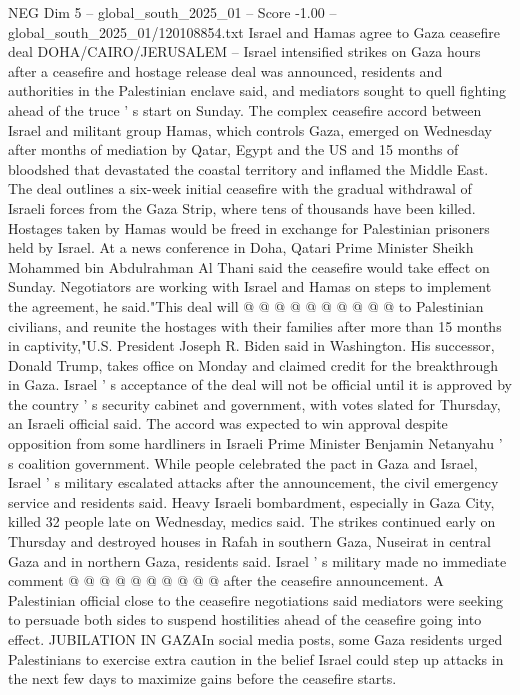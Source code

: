 \begin{textsample}{NEG Dim 5 – global\_south\_2025\_01 – Score -1.00 – global\_south\_2025\_01/120108854.txt}  \label{ex:f5_neg_107}
Israel and Hamas agree to Gaza ceasefire deal DOHA/CAIRO/JERUSALEM -- Israel intensified strikes on Gaza hours after a ceasefire and hostage release deal was announced, residents and authorities in the Palestinian enclave said, and mediators sought to quell fighting ahead of the truce ' s start on Sunday.
The complex ceasefire accord between Israel and militant group Hamas, which controls Gaza, emerged on Wednesday after months of mediation by Qatar, Egypt and the US and 15 months of bloodshed that devastated the coastal territory and inflamed the Middle East.
The deal outlines a six-week initial ceasefire with the gradual withdrawal of Israeli forces from the Gaza Strip, where tens of thousands have been killed.
Hostages taken by Hamas would be freed in exchange for Palestinian prisoners held by Israel.
At a news conference in Doha, Qatari Prime Minister Sheikh Mohammed bin Abdulrahman Al Thani said the ceasefire would take effect on Sunday.
Negotiators are working with Israel and Hamas on steps to implement the agreement, he said."This deal will @ @ @ @ @ @ @ @ @ @ to Palestinian civilians, and reunite the hostages with their families after more than 15 months in captivity,"U.S.
President Joseph R.
Biden said in Washington.
His successor, Donald Trump, takes office on Monday and claimed credit for the breakthrough in Gaza.
Israel ' s acceptance of the deal will not be official until it is approved by the country ' s security cabinet and government, with votes slated for Thursday, an Israeli official said.
The accord was expected to win approval despite opposition from some hardliners in Israeli Prime Minister Benjamin Netanyahu ' s coalition government.
While people celebrated the pact in Gaza and Israel, Israel ' s military escalated attacks after the announcement, the civil emergency service and residents said.
Heavy Israeli bombardment, especially in Gaza City, killed 32 people late on Wednesday, medics said.
The strikes continued early on Thursday and destroyed houses in Rafah in southern Gaza, Nuseirat in central Gaza and in northern Gaza, residents said.
Israel ' s military made no immediate comment @ @ @ @ @ @ @ @ @ @ after the ceasefire announcement.
A Palestinian official close to the ceasefire negotiations said mediators were seeking to persuade both sides to suspend hostilities ahead of the ceasefire going into effect.
JUBILATION IN GAZAIn social media posts, some Gaza residents urged Palestinians to exercise extra caution in the belief Israel could step up attacks in the next few days to maximize gains before the ceasefire starts.

\end{textsample}
